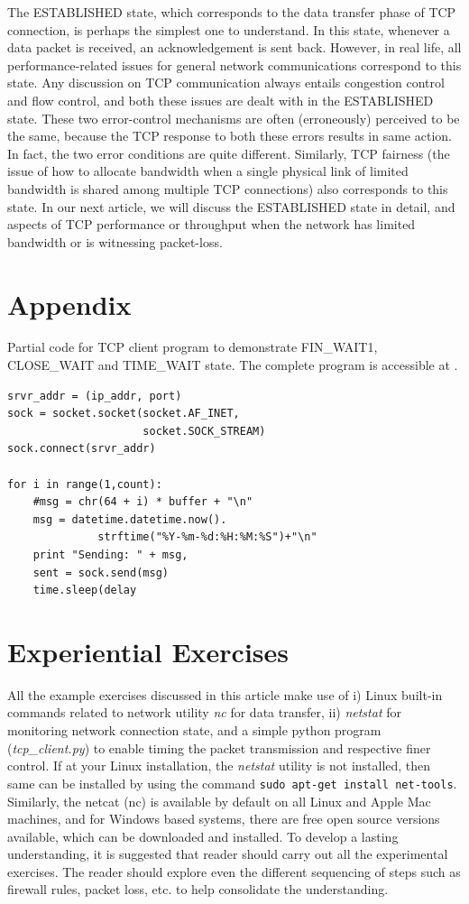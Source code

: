 \begin{multicols}{2}
The ESTABLISHED state, which corresponds to the data transfer phase of TCP connection, is perhaps the simplest one to understand. In this state, whenever a data packet is received, an acknowledgement is sent back. However, in real life, all performance-related issues for general network communications correspond to this state. Any discussion on TCP communication always entails congestion control and flow control, and both these issues are dealt with in the ESTABLISHED state. These two error-control mechanisms are often (erroneously) perceived to be the same, because the TCP response to both these errors results in same action. In fact, the two error conditions are quite different. Similarly, TCP fairness (the issue of how to allocate bandwidth when a single physical link of limited bandwidth is shared among multiple TCP connections) also corresponds to this state. In our next article, we will discuss the ESTABLISHED state in detail, and aspects of TCP performance or throughput when the network has limited bandwidth or is witnessing packet-loss.

\section{Appendix}

Partial code for TCP client program to demonstrate FIN\_WAIT1, CLOSE\_WAIT and TIME\_WAIT state. The complete program is accessible at \cite{chap3-key10}.
\begin{verbatim}
srvr_addr = (ip_addr, port)
sock = socket.socket(socket.AF_INET, 
                     socket.SOCK_STREAM)
sock.connect(srvr_addr)

for i in range(1,count):
    #msg = chr(64 + i) * buffer + "\n"
    msg = datetime.datetime.now().
	          strftime("%Y-%m-%d:%H:%M:%S")+"\n"
    print "Sending: " + msg,
    sent = sock.send(msg)
    time.sleep(delay
\end{verbatim}

\section{Experiential Exercises}

All the example exercises discussed in this article make use of i) Linux built-in commands related to network utility \textit{nc} for data transfer, ii) \textit{netstat} for monitoring network connection state, and a simple python program (\textit{tcp\_client.py}) to enable timing the packet transmission and respective finer control. If at your Linux installation, the \textit{netstat} utility is not installed, then same can be installed by using the command \lstinline|sudo apt-get install net-tools|. Similarly, the netcat (nc) is available by default on all Linux and Apple Mac machines, and for Windows based systems, there are free open source versions available, which can be downloaded and installed. To develop a lasting understanding, it is suggested that reader should carry out all the experimental exercises. The reader should explore even the different sequencing of steps such as firewall rules, packet loss, etc. to help consolidate the understanding.


\end{multicols}
